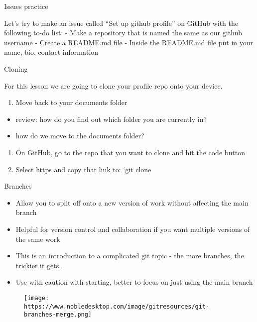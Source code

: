 \documentclass[ignorenonframetext,]{beamer}
\providecommand{\tightlist}{%
  \setlength{\itemsep}{0pt}\setlength{\parskip}{0pt}}
\begin{document}
\begin{frame}{Issues practice}

Let's try to make an issue called ``Set up github profile'' on GitHub
with the following to-do list: - Make a repository that is named the
same as our github username - Create a README.md file - Inside the
README.md file put in your name, bio, contact information

\end{frame}

\begin{frame}{Cloning}

For this lesson we are going to clone your profile repo onto your
device.

\begin{enumerate}
\def\labelenumi{\arabic{enumi}.}
\tightlist
\item
  Move back to your documents folder
\end{enumerate}

\begin{itemize}
\tightlist
\item
  review: how do you find out which folder you are currently in?
\item
  how do we move to the documents folder?
\end{itemize}

\begin{enumerate}
\def\labelenumi{\arabic{enumi}.}
\setcounter{enumi}{1}
\tightlist
\item
  On GitHub, go to the repo that you want to clone and hit the code
  button
\item
  Select https and copy that link to: `git clone 
\end{enumerate}

\end{frame}

\begin{frame}{Branches}

\begin{itemize}
\tightlist
\item
  Allow you to split off onto a new version of work without affecting
  the main branch
\item
  Helpful for version control and collaboration if you want multiple
  versions of the same work
\item
  This is an introduction to a complicated git topic - the more
  branches, the trickier it gets.
\item
  Use with caution with starting, better to focus on just using the main
  branch
\end{itemize}

\begin{figure}
\centering
\texttt{[image: https://www.nobledesktop.com/image/gitresources/git-branches-merge.png]}
\caption{}
\end{figure}

\end{frame}
\end{document}
